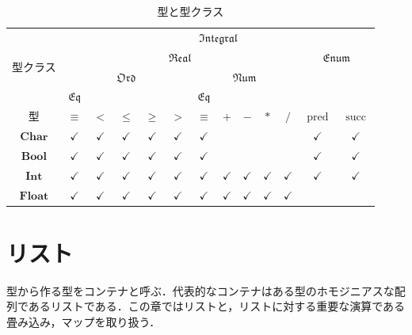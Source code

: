 \documentclass[a4paper]{jsbook}
\newenvironment{leader}{\begingroup}{\endgroup}
\newcommand{\mType}[1]{\mathbf{#1}}
\newcommand{\mBoolType}{\mType{Bool}}
\newcommand{\mCharType}{\mType{Char}}
\newcommand{\mIntType}{\mType{Int}}
\newcommand{\mFloatType}{\mType{Float}}
\newcommand{\mSpecialTypeClass}[1]{\mathfrak{#1}} %
\newcommand{\mEqTypeClass}{\mSpecialTypeClass{Eq}}
\newcommand{\mOrdTypeClass}{\mSpecialTypeClass{Ord}}
\newcommand{\mNumTypeClass}{\mSpecialTypeClass{Num}}
\newcommand{\mRealTypeClass}{\mSpecialTypeClass{Real}}
\newcommand{\mEnumTypeClass}{\mSpecialTypeClass{Enum}}
\newcommand{\mIntegralTypeClass}{\mSpecialTypeClass{Integral}}
\DeclareMathOperator{\mathPred}{pred}
\DeclareMathOperator{\mathSucc}{succ}
\begin{document}
\begin{table}
\caption{型と型クラス}
\label{tab:type-and-typeclass}
\begin{center}
\begin{tabular}{||c||c|c|c|c|c|c|c|c|c|c|c|c||}
\hline
\multirow{4}{*}{型クラス}
    &\multicolumn{12}{|c||}{$\mIntegralTypeClass$}\\
\cline{2-13}
\multirow{3}{*}{}
    &\multicolumn{10}{|c|}{$\mRealTypeClass$}
    &\multicolumn{2}{|c||}{$\mEnumTypeClass$}\\
\cline{2-11}
\multirow{2}{*}{}
    &\multicolumn{5}{|c|}{$\mOrdTypeClass$}
    &\multicolumn{5}{|c|}{$\mNumTypeClass$}
    &\multicolumn{2}{|c||}{ }\\
\cline{2-2}\cline{7-7}
{ }
    &$\mEqTypeClass$
    &\multicolumn{4}{|c|}{ }
    &$\mEqTypeClass$
    &\multicolumn{4}{|c|}{ }
    &\multicolumn{2}{|c||}{ }\\
\hline\hline
型
    &$\equiv$
    &$<$
    &$\le$
    &$\ge$
    &$>$
    &$\equiv$
    &$+$
    &$-$
    &$*$
    &$/$
    &$\mathPred$
    &$\mathSucc$\\
\hline
$\mCharType$
    &$\checkmark$
    &$\checkmark$
    &$\checkmark$
    &$\checkmark$
    &$\checkmark$
    &$\checkmark$
    &
    &
    &
    &
    &$\checkmark$
    &$\checkmark$\\
\hline
$\mBoolType$
    &$\checkmark$
    &$\checkmark$
    &$\checkmark$
    &$\checkmark$
    &$\checkmark$
    &$\checkmark$
    &
    &
    &
    &
    &$\checkmark$
    &$\checkmark$\\
\hline
$\mIntType$
    &$\checkmark$
    &$\checkmark$
    &$\checkmark$
    &$\checkmark$
    &$\checkmark$
    &$\checkmark$
    &$\checkmark$
    &$\checkmark$
    &$\checkmark$
    &$\checkmark$
    &$\checkmark$
    &$\checkmark$\\
\hline
$\mFloatType$
    &$\checkmark$
    &$\checkmark$
    &$\checkmark$
    &$\checkmark$
    &$\checkmark$
    &$\checkmark$
    &$\checkmark$
    &$\checkmark$
    &$\checkmark$
    &$\checkmark$
    &
    &\\
\hline
\end{tabular}
\end{center}
\end{table}


\chapter{リスト}
\begin{leader}
型から作る型をコンテナと呼ぶ．代表的なコンテナはある型のホモジニアスな配列であるリストである．この章ではリストと，リストに対する重要な演算である畳み込み，マップを取り扱う．
\end{leader}
\end{document}
